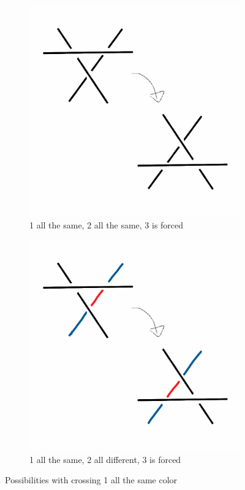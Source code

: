 \documentclass[12pt,letterpaper]{article}
\theoremstyle{definition}
\begin{document}
\begin{figure}[h!]
    \centering
    \begin{subfigure}{.4\textwidth}
        \centering
        \includegraphics[width=\textwidth]{meeting10pics/1s2s.png}
        \caption{1 all the same, 2 all the same, 3 is forced}
    \end{subfigure}
    \qquad
    \begin{subfigure}{.4\textwidth}
        \centering
        \includegraphics[width=\textwidth]{meeting10pics/1s2d.png}
        \caption{1 all the same, 2 all different, 3 is forced}
    \end{subfigure}
    \caption{Possibilities with crossing 1 all the same color}
\end{figure}
\end{document}
